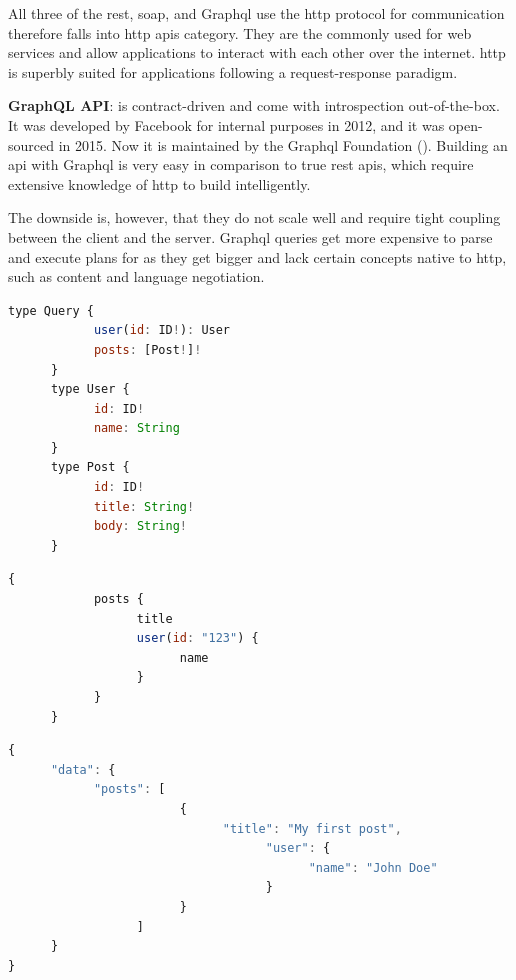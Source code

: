 \begin{multicols}{2}
      All three of the \acrshort{rest}, \acrshort{soap}, and Graph\acrshort{ql} use the \acrshort{http} protocol for
      communication therefore falls into \acrshort{http} \acrshort{api}s category. They are the commonly used for web
      services  and allow applications to interact with each other over the internet. \acrshort{http} is superbly
      suited for applications following a request-response paradigm.

      \textbf{GraphQL API}:
      is contract-driven and come with introspection out-of-the-box. It was developed by Facebook for internal purposes 
      in 2012, and it was open-sourced in 2015. Now it is maintained by the Graph\acrshort{ql} Foundation (\cite{graphql}).
      Building an \acrshort{api} with Graph\acrshort{ql} is very easy in comparison to true \acrshort{rest} \acrshort{api}s, 
      which require extensive knowledge of \acrshort{http} to build intelligently. 

      The downside is, however, that they do not scale well and require tight coupling between the client and the
      server. Graph\acrshort{ql} queries get more expensive to parse and execute plans for as they get bigger and
      lack certain concepts native to \acrshort{http}, such as content and language negotiation.
\end{multicols}
\begin{lstlisting}[language=JavaScript, caption=GraphQL's Schema Example]
      type Query {
            user(id: ID!): User
            posts: [Post!]!
      }
      type User {
            id: ID!
            name: String
      }
      type Post {
            id: ID!
            title: String!
            body: String!
      }
\end{lstlisting}
\begin{lstlisting}[language=JavaScript, caption=GraphQL's Request Example to Specific Data]
      {
            posts {
                  title
                  user(id: "123") {
                        name
                  }
            }
      }
\end{lstlisting}
\begin{lstlisting}[language=JavaScript, caption=GraphQL's Return Data Example]
{
      "data": {
            "posts": [
                        {
                              "title": "My first post",
                                    "user": {
                                          "name": "John Doe"
                                    }
                        }
                  ]
      }
}            
\end{lstlisting}
